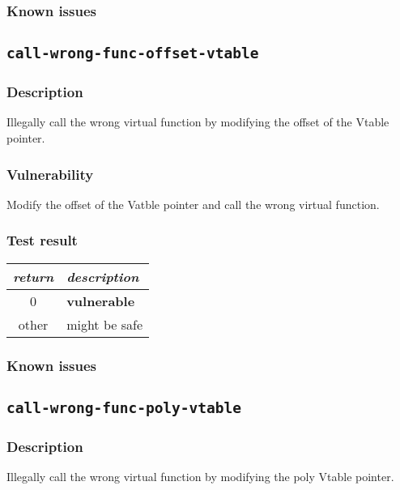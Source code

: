 \documentclass[a4paper]{book}
\begin{document}
\subsubsection{Known issues}

\newpage
\subsection{\texttt{call-wrong-func-offset-vtable}}\label{test-call-wrong-func-offset-vtable}

\subsubsection{Description}
Illegally call the wrong virtual function by modifying the offset of the Vtable pointer.

\subsubsection{Vulnerability}
Modify the offset of the Vatble pointer and call the wrong virtual function.

\subsubsection{Test result}
\begin{tabular}{cl}
  \toprule
  \emph{return}  & \emph{description} \\
  \midrule
  0              & \textbf{vulnerable} \\
  other          & might be safe \\
  \bottomrule
\end{tabular}
  
\subsubsection{Known issues}
\newpage


\subsection{\texttt{call-wrong-func-poly-vtable}}\label{test-call-wrong-func-poly-vtable}

\subsubsection{Description}
Illegally call the wrong virtual function by modifying the poly Vtable pointer.
\end{document}
